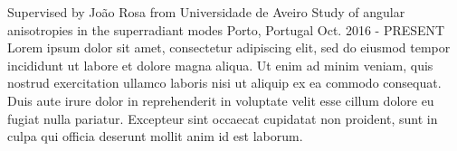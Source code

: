 

\begin{cventries}

	\cventry
	{Supervised by João Rosa from Universidade de Aveiro}
	{Study of angular anisotropies in the superradiant modes}
	{Porto, Portugal} %
	{Oct. 2016 - PRESENT} %
	{
		Lorem ipsum dolor sit amet, consectetur adipiscing elit, sed do eiusmod tempor incididunt ut labore et dolore magna aliqua. Ut enim ad minim veniam, quis nostrud exercitation ullamco laboris nisi ut aliquip ex ea commodo consequat. Duis aute irure dolor in reprehenderit in voluptate velit esse cillum dolore eu fugiat nulla pariatur. Excepteur sint occaecat cupidatat non proident, sunt in culpa qui officia deserunt mollit anim id est laborum.
	}
	
\end{cventries}